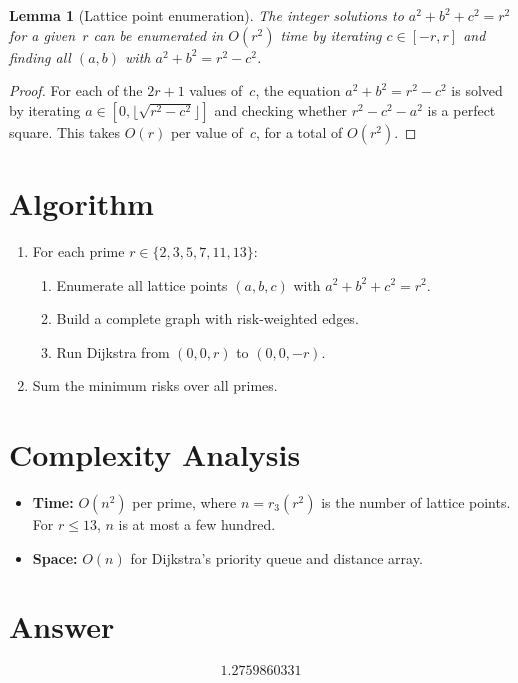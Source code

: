 \documentclass[a4paper,12pt]{article}
\newtheorem{lemma}[theorem]{Lemma}
\begin{document}
\begin{lemma}[Lattice point enumeration]
The integer solutions to $a^2+b^2+c^2 = r^2$ for a given~$r$ can be enumerated in $O(r^2)$ time by iterating $c \in [-r, r]$ and finding all $(a,b)$ with $a^2+b^2 = r^2 - c^2$.
\end{lemma}

\begin{proof}
For each of the $2r+1$ values of~$c$, the equation $a^2+b^2 = r^2-c^2$ is solved by iterating $a \in [0, \lfloor\sqrt{r^2-c^2}\rfloor]$ and checking whether $r^2-c^2-a^2$ is a perfect square. This takes $O(r)$ per value of~$c$, for a total of $O(r^2)$.
\end{proof}

\section{Algorithm}

\begin{enumerate}
    \item For each prime $r \in \{2,3,5,7,11,13\}$:
    \begin{enumerate}
        \item Enumerate all lattice points $(a,b,c)$ with $a^2+b^2+c^2 = r^2$.
        \item Build a complete graph with risk-weighted edges.
        \item Run Dijkstra from $(0,0,r)$ to $(0,0,-r)$.
    \end{enumerate}
    \item Sum the minimum risks over all primes.
\end{enumerate}

\section{Complexity Analysis}

\begin{itemize}
    \item \textbf{Time:} $O(n^2)$ per prime, where $n = r_3(r^2)$ is the number of lattice points. For $r \le 13$, $n$ is at most a few hundred.
    \item \textbf{Space:} $O(n)$ for Dijkstra's priority queue and distance array.
\end{itemize}

\section{Answer}

\[
\boxed{1.2759860331}
\]
\end{document}

